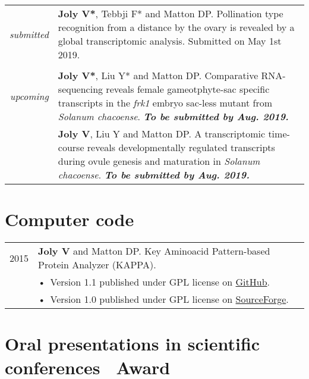 \documentclass[letterpaper,12pt]{article}
\begin{document}
\begin{tabularx}{\textwidth}{@{}r|X@{}}
{\em submitted}
& \textbf{Joly V*}, Tebbji F* and Matton DP.
  Pollination type recognition from a distance by the ovary is revealed by a
  global transcriptomic analysis.
  Submitted on May 1st 2019.
  \\

\multicolumn{2}{c}{} \\

{\em upcoming}
& \textbf{Joly V*}, Liu Y* and Matton DP.
  Comparative RNA-sequencing reveals female gameotphyte-sac specific transcripts
  in the \emph{frk1} embryo sac-less mutant from \emph{Solanum chacoense}.
  {\bfseries\em To be submitted by Aug. 2019.}
  \vspace{3mm}
  \\

& \textbf{Joly V}, Liu Y and Matton DP.
  A transcriptomic time-course reveals developmentally regulated transcripts
  during ovule genesis and maturation in \emph{Solanum chacoense}.
  {\bfseries\em To be submitted by Aug. 2019.} \\

\end{tabularx}

\vspace{6mm}

\section[Computer code]{Computer code}

\begin{tabularx}{\textwidth}{@{}r|X@{}}

2015
& \textbf{Joly V} and Matton DP. Key Aminoacid Pattern-based Protein Analyzer
  (KAPPA). \\
& \small \hspace{1.5mm} •~Version 1.1 published under GPL license on
  \href{https://github.com/valentinjoly/kappa-1.1}{GitHub}. \\
& \small \hspace{1.5mm} •~Version 1.0 published under GPL license on
  \href{https://sourceforge.net/projects/kappa-sequence-search/}{SourceForge}.
  \\

\end{tabularx}

\newpage

\section[Oral presentations]{Oral presentations
         \small in scientific conferences \hfill {\mdseries\faStar}~Award}
\end{document}
